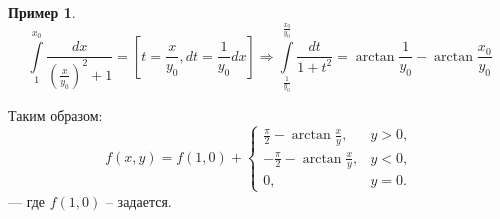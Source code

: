 \documentclass[a5paper]{article}
\newcounter{through}
\theoremstyle{plain}
\theoremstyle{definition}
\newtheorem{example}[through]{Пример}
\numberwithin{through}{section}
\numberwithin{equation}{section}
\begin{document}
\begin{example}
	\begin{equation*}
		\int\limits_1^{x_0} \frac{dx}{\left(\frac{x}{y_0}\right)^2 + 1} = \left[ t = \frac{x}{y_0}, dt = \frac{1}{y_0}dx \right]
		\Rightarrow \int\limits_{\frac{1}{y_0}}^{\frac{x_0}{y_0}} \frac{dt}{1 + t^2} = \arctan \frac{1}{y_0} - \arctan \frac{x_0}{y_0}
	\end{equation*}
	
	Таким образом:
	\begin{equation*}
		f(x, y) = f(1, 0) +
		 \begin{cases}
		\frac{\pi}{2} - \arctan \frac{x}{y}, & y > 0,\\
		- \frac{\pi}{2} - \arctan \frac{x}{y}, & y < 0,\\
		0, & y = 0.
		\end{cases}
	\end{equation*}
	--- где $f(1, 0)$ -- задается.
\end{example}
\end{document}
